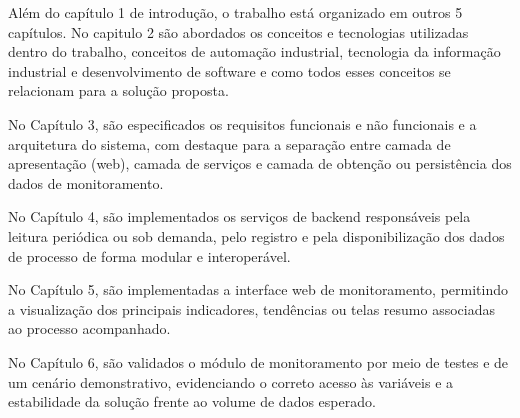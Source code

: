 \par Além do capítulo 1 de introdução, o trabalho está organizado em outros 5 capítulos. No capitulo 2 são abordados os conceitos e tecnologias utilizadas dentro do trabalho, conceitos de automação industrial, tecnologia da informação industrial e desenvolvimento de software e como todos esses conceitos se relacionam para a solução proposta.

\par No Capítulo 3, são especificados os requisitos funcionais e não funcionais e a arquitetura do sistema, com destaque para a separação entre camada de apresentação (web), camada de serviços e camada de obtenção ou persistência dos dados de monitoramento.

\par No Capítulo 4, são implementados os serviços de backend responsáveis pela leitura periódica ou sob demanda, pelo registro e pela disponibilização dos dados de processo de forma modular e interoperável.


\par No Capítulo 5, são implementadas a interface web de monitoramento, permitindo a visualização dos principais indicadores, tendências ou telas resumo associadas ao processo acompanhado.

\par No Capítulo 6, são validados o módulo de monitoramento por meio de testes e de um cenário demonstrativo, evidenciando o correto acesso às variáveis e a estabilidade da solução frente ao volume de dados esperado.